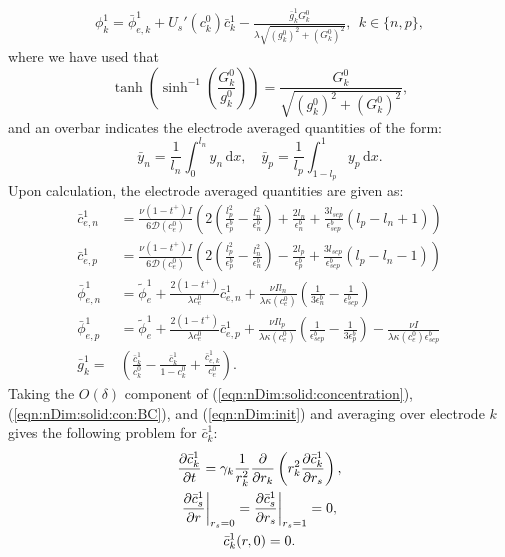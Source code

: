 \documentclass[preprint]{elsarticle}
\begin{document}
\begin{gather}\label{eqn:od:BV_av}
	\phi_k^1 = \bar{\phi}_{e,k}^1 + U_s'(c_k^0)\bar{c}_k^1 - \frac{\bar{g}_k^1G_k^0}{\lambda\sqrt{(g_k^0)^2 + (G_k^0)^2}}, \ \ k\in\{n,p\},
\end{gather} 
where we have used that
\begin{equation} 
	\tanh\left(\sinh^{-1}\left(\frac{G_k^0}{g_k^0} \right) \right) = \frac{G_k^0}{\sqrt{(g_k^0)^2 + (G_k^0)^2}},
\end{equation}
and an overbar indicates the electrode averaged quantities of the form:
\begin{equation*}
	\bar{y}_n = \frac{1}{l_n}\int_{0}^{l_n}y_n\, \text{d}x, \quad 		\bar{y}_p = \frac{1}{l_p}\int_{1-l_p}^{1}y_p\, \text{d}x.
\end{equation*}
Upon calculation, the electrode averaged quantities are given as:
\begin{subequations}  
\begin{align} 	
	\bar{c}_{e,n}^1 &= \frac{\nu (1-t^+) I}{ 6 \mathcal{D}(c_e^0)}\left( 2\left(\frac{l_p^2}{\epsilon_p^b} - \frac{l_n^2}{\epsilon_n^b} \right) + \frac{2 l_n}{\epsilon_n^b} + \frac{3l_{sep}}{\epsilon_{sep}^{b}}(l_p-l_n+1)\right) \\ 
    \bar{c}_{e,p}^1 &= \frac{\nu (1-t^+) I}{ 6 \mathcal{D}(c_e^0)}\left( 2\left(\frac{l_p^2}{\epsilon_p^b} - \frac{l_n^2}{\epsilon_n^b} \right) - \frac{2 l_p}{\epsilon_p^b} + \frac{3l_{sep}}{\epsilon_{sep}^{b}}(l_p-l_n-1)\right) \\ 
    \bar{\phi}_{e,n}^1 &= \tilde{\phi}_e^1 +\frac{2(1-t^+)}{\lambda c_e^0} \bar{c}_{e,n}^1 + \frac{\nu Il_n}{\lambda \kappa(c_e^0)}\left(\frac{1}{3 \epsilon_{n}^b} - \frac{1}{\epsilon_{sep}^b}\right) \\ 
    \bar{\phi}_{e,p}^1 &= \tilde{\phi}_e^1 +\frac{2(1-t^+)}{\lambda c_e^0} \bar{c}_{e,p}^1 + \frac{\nu Il_p}{\lambda \kappa(c_e^0)}\left(\frac{1}{ \epsilon_{sep}^b} - \frac{1}{3\epsilon_p^b}\right) - \frac{\nu I}{\lambda \kappa(c_e^0)\epsilon_{sep}^b} \\
    \bar{g}_k^1 =& \left(\frac{\bar{c}_k^1}{c_k^0} - \frac{\bar{c}_k^1}{1-c_k^0} + \frac{\bar{c}_{e,k}^1}{c_e^0} \right).
\end{align} 
\end{subequations} 
Taking the $O(\delta)$ component of (\ref{eqn:nDim:solid:concentration}), (\ref{eqn:nDim:solid:con:BC}), and (\ref{eqn:nDim:init}) and averaging over electrode $k$ gives the following problem for $\bar{c}_k^1$: 
\begin{gather}
     \pdv{\bar{c}_k^1}{t} = \gamma_k \frac{1}{r_k^2}\pdv{r_k}\left(r_k^2 \pdv{\bar{c}_k^1}{r_s}\right), \\
     \pdv{\bar{c}_s^1}{r}\bigg|_{r_s=0} = 
     \pdv{\bar{c}_s^1}{r_s}\bigg|_{r_s=1} = 0, \\ 
     \bar{c}_k^1(r, 0) = 0.
    \end{gather} 
\end{document}
